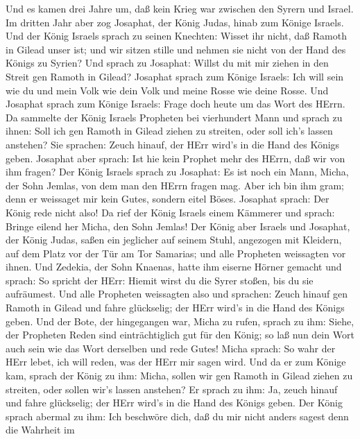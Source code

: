  Und es kamen drei Jahre um, daß kein Krieg war zwischen den
Syrern und Israel.  Im dritten Jahr aber zog Josaphat, der
König Judas, hinab zum Könige Israels.  Und der König
Israels sprach zu seinen Knechten: Wisset ihr nicht, daß Ramoth in
Gilead unser ist; und wir sitzen stille und nehmen sie nicht von der
Hand des Königs zu Syrien?  Und sprach zu Josaphat: Willst
du mit mir ziehen in den Streit gen Ramoth in Gilead? Josaphat sprach
zum Könige Israels: Ich will sein wie du und mein Volk wie dein Volk und
meine Rosse wie deine Rosse.  Und Josaphat sprach zum Könige
Israels: Frage doch heute um das Wort des HErrn.  Da
sammelte der König Israels Propheten bei vierhundert Mann und sprach zu
ihnen: Soll ich gen Ramoth in Gilead ziehen zu streiten, oder soll ich's
lassen anstehen? Sie sprachen: Zeuch hinauf, der HErr wird's in die Hand
des Königs geben.  Josaphat aber sprach: Ist hie kein
Prophet mehr des HErrn, daß wir von ihm fragen?  Der König
Israels sprach zu Josaphat: Es ist noch ein Mann, Micha, der Sohn
Jemlas, von dem man den HErrn fragen mag. Aber ich bin ihm gram; denn er
weissaget mir kein Gutes, sondern eitel Böses. Josaphat sprach: Der
König rede nicht also!  Da rief der König Israels einem
Kämmerer und sprach: Bringe eilend her Micha, den Sohn Jemlas!
 Der König aber Israels und Josaphat, der König Judas,
saßen ein jeglicher auf seinem Stuhl, angezogen mit Kleidern, auf dem
Platz vor der Tür am Tor Samarias; und alle Propheten weissagten vor
ihnen.  Und Zedekia, der Sohn Knaenas, hatte ihm eiserne
Hörner gemacht und sprach: So spricht der HErr: Hiemit wirst du die
Syrer stoßen, bis du sie aufräumest.  Und alle Propheten
weissagten also und sprachen: Zeuch hinauf gen Ramoth in Gilead und
fahre glückselig; der HErr wird's in die Hand des Königs geben.
 Und der Bote, der hingegangen war, Micha zu rufen, sprach
zu ihm: Siehe, der Propheten Reden sind einträchtiglich gut für den
König; so laß nun dein Wort auch sein wie das Wort derselben und rede
Gutes!  Micha sprach: So wahr der HErr lebet, ich will
reden, was der HErr mir sagen wird.  Und da er zum Könige
kam, sprach der König zu ihm: Micha, sollen wir gen Ramoth in Gilead
ziehen zu streiten, oder sollen wir's lassen anstehen? Er sprach zu ihm:
Ja, zeuch hinauf und fahre glückselig; der HErr wird's in die Hand des
Königs geben.  Der König sprach abermal zu ihm: Ich
beschwöre dich, daß du mir nicht anders sagest denn die Wahrheit im
